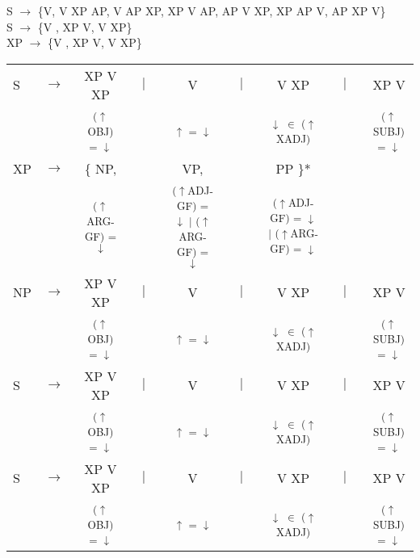 \documentclass[12pt,a4paper]{article}
\begin{document}
S  $\rightarrow$  \{V, V  XP AP, V AP XP, XP V AP, AP V XP, XP AP V, AP XP V\}\\
S  $\rightarrow$  \{V , XP V, V XP\}\\
XP $\rightarrow$  \{V , XP V, V XP\}\\

\begin{singlespace}
\begin{tabular}{ l  l  c  c  c  c  c  c  c}
S & $\rightarrow$ & XP V XP & $\mid$ & V & $\mid$ & V XP & $\mid$ & XP V \\
   & $\qquad$ & \textsuperscript{($\uparrow$OBJ) = $\downarrow$} &    $\qquad$ &\textsuperscript{$\uparrow$ = $\downarrow$} & $\qquad$ & \textsuperscript{$\downarrow$ $\in$ ($\uparrow$XADJ)} & $\qquad$ & \textsuperscript{($\uparrow$SUBJ) = $\downarrow$} \\
XP & $\rightarrow$ & \{ NP, & $\qquad$ & VP, & $\qquad$ & PP \}* \\
   & $\qquad$ & \textsuperscript{($\uparrow$ARG-GF) = $\downarrow$} &    $\qquad$ &\textsuperscript{($\uparrow$ADJ-GF) = $\downarrow$ $\mid$ ($\uparrow$ARG-GF) = $\downarrow$} & $\qquad$ & \textsuperscript{($\uparrow$ADJ-GF) = $\downarrow$ $\mid$ ($\uparrow$ARG-GF) = $\downarrow$} \\
   NP & $\rightarrow$ & XP V XP & $\mid$ & V & $\mid$ & V XP & $\mid$ & XP V \\
   & $\qquad$ & \textsuperscript{($\uparrow$OBJ) = $\downarrow$} &    $\qquad$ &\textsuperscript{$\uparrow$ = $\downarrow$} & $\qquad$ & \textsuperscript{$\downarrow$ $\in$ ($\uparrow$XADJ)} & $\qquad$ & \textsuperscript{($\uparrow$SUBJ) = $\downarrow$} \\
   S & $\rightarrow$ & XP V XP & $\mid$ & V & $\mid$ & V XP & $\mid$ & XP V \\
   & $\qquad$ & \textsuperscript{($\uparrow$OBJ) = $\downarrow$} &    $\qquad$ &\textsuperscript{$\uparrow$ = $\downarrow$} & $\qquad$ & \textsuperscript{$\downarrow$ $\in$ ($\uparrow$XADJ)} & $\qquad$ & \textsuperscript{($\uparrow$SUBJ) = $\downarrow$} \\
   S & $\rightarrow$ & XP V XP & $\mid$ & V & $\mid$ & V XP & $\mid$ & XP V \\
   & $\qquad$ & \textsuperscript{($\uparrow$OBJ) = $\downarrow$} &    $\qquad$ &\textsuperscript{$\uparrow$ = $\downarrow$} & $\qquad$ & \textsuperscript{$\downarrow$ $\in$ ($\uparrow$XADJ)} & $\qquad$ & \textsuperscript{($\uparrow$SUBJ) = $\downarrow$} \\
\end{tabular}\\
\end{singlespace}
\end{document}
